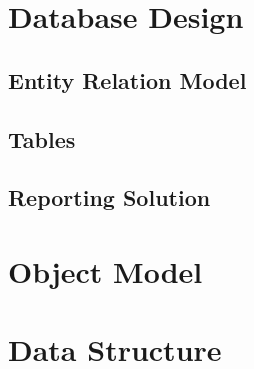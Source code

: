 \documentclass[]{article}
\begin{document}
	\newpage
	\section{Database Design}

	
	\subsection{Entity Relation Model}

	
	\subsection{Tables}

	
	\subsection{Reporting Solution}

	
	\newpage
	\section{Object Model}

	
	\newpage
	\section{Data Structure}
\end{document}
